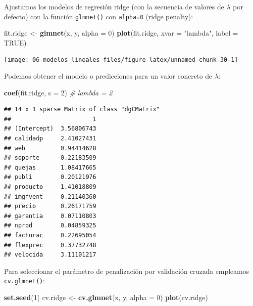 \documentclass[
]{book}
\newenvironment{Shaded}{\begin{snugshade}}{\end{snugshade}}
\newcommand{\CommentTok}[1]{\textcolor[rgb]{0.56,0.35,0.01}{\textit{#1}}}
\newcommand{\DataTypeTok}[1]{\textcolor[rgb]{0.13,0.29,0.53}{#1}}
\newcommand{\DecValTok}[1]{\textcolor[rgb]{0.00,0.00,0.81}{#1}}
\newcommand{\KeywordTok}[1]{\textcolor[rgb]{0.13,0.29,0.53}{\textbf{#1}}}
\newcommand{\NormalTok}[1]{#1}
\newcommand{\OtherTok}[1]{\textcolor[rgb]{0.56,0.35,0.01}{#1}}
\newcommand{\StringTok}[1]{\textcolor[rgb]{0.31,0.60,0.02}{#1}}
\theoremstyle{break}
\theoremstyle{definition}
\theoremstyle{definition}
\theoremstyle{definition}
\theoremstyle{remark}
\begin{document}
Ajustamos los modelos de regresión ridge (con la secuencia de valores de \(\lambda\) por defecto) con la función \texttt{glmnet()} con \texttt{alpha=0} (ridge penalty):

\begin{Shaded}
\begin{Highlighting}[]
\NormalTok{fit.ridge <-}\StringTok{ }\KeywordTok{glmnet}\NormalTok{(x, y, }\DataTypeTok{alpha =} \DecValTok{0}\NormalTok{)}
\KeywordTok{plot}\NormalTok{(fit.ridge, }\DataTypeTok{xvar =} \StringTok{"lambda"}\NormalTok{, }\DataTypeTok{label =} \OtherTok{TRUE}\NormalTok{)}
\end{Highlighting}
\end{Shaded}

\begin{center}\texttt{[image: 06-modelos\_lineales\_files/figure-latex/unnamed-chunk-30-1]} \end{center}

Podemos obtener el modelo o predicciones para un valor concreto de \(\lambda\):

\begin{Shaded}
\begin{Highlighting}[]
\KeywordTok{coef}\NormalTok{(fit.ridge, }\DataTypeTok{s =} \DecValTok{2}\NormalTok{) }\CommentTok{# lambda = 2}
\end{Highlighting}
\end{Shaded}

\begin{verbatim}
## 14 x 1 sparse Matrix of class "dgCMatrix"
##                       1
## (Intercept)  3.56806743
## calidadp     2.41027431
## web          0.94414628
## soporte     -0.22183509
## quejas       1.08417665
## publi        0.20121976
## producto     1.41018809
## imgfvent     0.21140360
## precio       0.26171759
## garantia     0.07110803
## nprod        0.04859325
## facturac     0.22695054
## flexprec     0.37732748
## velocida     3.11101217
\end{verbatim}

Para seleccionar el parámetro de penalización por validación cruzada empleamos \texttt{cv.glmnet()}:

\begin{Shaded}
\begin{Highlighting}[]
\KeywordTok{set.seed}\NormalTok{(}\DecValTok{1}\NormalTok{)}
\NormalTok{cv.ridge <-}\StringTok{ }\KeywordTok{cv.glmnet}\NormalTok{(x, y, }\DataTypeTok{alpha =} \DecValTok{0}\NormalTok{)}
\KeywordTok{plot}\NormalTok{(cv.ridge)}
\end{Highlighting}
\end{Shaded}
\end{document}
